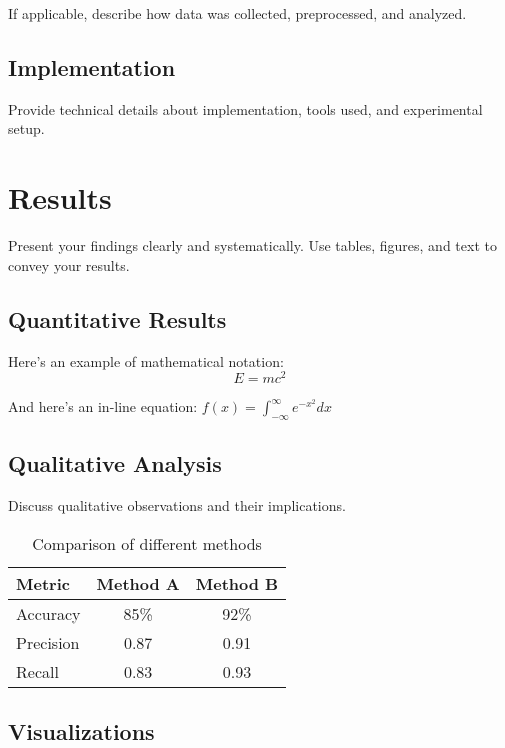 \documentclass[11pt,a4paper]{article}
\theoremstyle{definition}
\begin{document}
If applicable, describe how data was collected, preprocessed, and analyzed.

\subsection{Implementation}

Provide technical details about implementation, tools used, and experimental setup.

\section{Results}

Present your findings clearly and systematically. Use tables, figures, and text to convey your results.

\subsection{Quantitative Results}

Here's an example of mathematical notation:
\begin{equation}
    E = mc^2
    \label{eq:einstein}
\end{equation}

And here's an in-line equation: $f(x) = \int_{-\infty}^{\infty} e^{-x^2} dx$

\subsection{Qualitative Analysis}

Discuss qualitative observations and their implications.

\begin{table}[h]
    \centering
    \begin{tabular}{|l|c|c|}
        \hline
        \textbf{Metric} & \textbf{Method A} & \textbf{Method B} \\
        \hline
        Accuracy & 85\% & 92\% \\
        Precision & 0.87 & 0.91 \\
        Recall & 0.83 & 0.93 \\
        \hline
    \end{tabular}
    \caption{Comparison of different methods}
    \label{tab:comparison}
\end{table}

\subsection{Visualizations}
\end{document}
